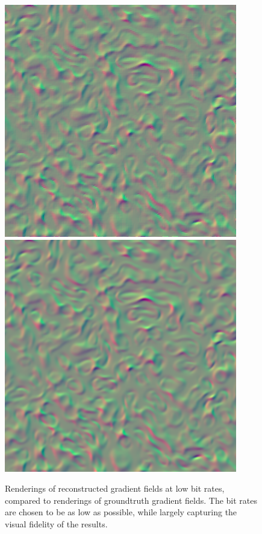 \begin{figure}[h]
	{\includegraphics[width=0.24\linewidth]{img/gradient/diffusivity-gradient.png}}
	{\includegraphics[width=0.24\linewidth]{img/gradient/diffusivity-groundtruth-gradient.png}}
	\caption{Renderings of reconstructed gradient fields at low bit rates, compared to renderings of groundtruth gradient fields. The bit rates are chosen to be as low as possible, while largely capturing the visual fidelity of the results.}
  \label{fig:gradient-rendering}
\end{figure}

